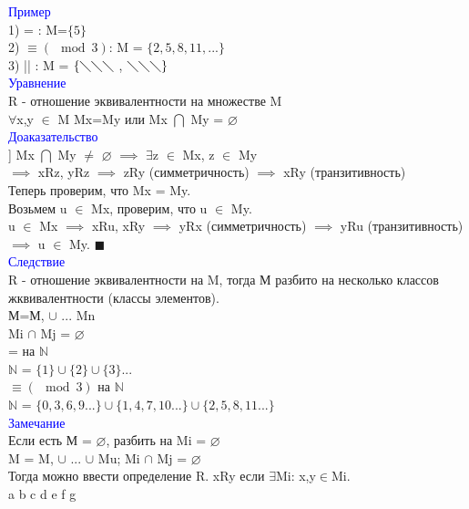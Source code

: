 \documentclass[a4paper,12pt]{article}   %
\begin{document}
\textcolor{blue}{Пример} \\
1) = : M=$\{5\}$ \\
2) $\equiv (\mod 3)$: M = $\{2,5,8,11,...\}$ \\
3) || : M = $\{  \diagdown \diagdown \diagdown$ , $\diagdown \diagdown \diagdown \}$\\ 
\textcolor{blue}{Уравнение} \\
R - отношение эквивалентности на множестве M \\
$\forall$x,y $\in$ M Mx=My или Mx $\bigcap$ My = $\varnothing$ \\
\textcolor{blue}{Доаказательство} \\
] Mx $\bigcap$ My $\neq$ $\varnothing$ $\implies$ $\exists$z $\in$ Mx, z $\in$ My \\
$\implies$ xRz, yRz $\implies$ zRy (симметричность) $\implies$ xRy (транзитивность) \\
Теперь проверим, что Mx = My. \\
Возьмем u $\in$ Mx, проверим, что u $\in$ My. \\
u $\in$ Mx $\implies$ xRu, xRy $\implies$ yRx (симметричность) $\implies$ yRu (транзитивность) $\implies$ u $\in$ My. $\blacksquare$ \\
\textcolor{blue}{Следствие} \\
R - отношение эквивалентности на M, тогда М разбито на несколько классов жквивалентности (классы элементов). \\
М=М, $\cup$ ... Mn \\
Mi $\cap$ Mj = $\varnothing$ \\
= на $\mathbb{N}$ \\
$\mathbb{N}$ = $\{1\} \cup \{2\} \cup \{3\}...$ \\
$\equiv (\mod 3)$ на $\mathbb{N}$ \\
$\mathbb{N}$ = $\{0, 3,  6,  9...\} \cup \{1, 4, 7, 10...\} \cup \{2, 5, 8, 11...\}$ \\
\textcolor{blue}{Замечание} \\
Если есть М = $\varnothing$, разбить на Mi = $\varnothing$ \\
M = M, $\cup$ ... $\cup$ Mu; Mi $\cap$ Mj = $\varnothing$ \\
Тогда можно ввести определение R.
xRy если $\exists$Mi: x,y$\in$Mi.\\
a b c d e f g \\
\end{document}
